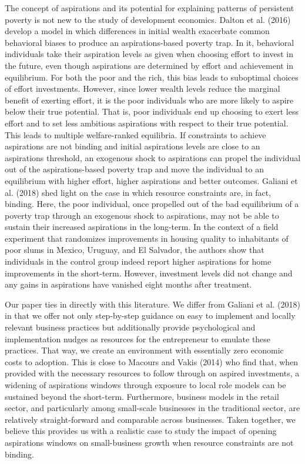 \documentclass[11.5pt]{article}
\begin{document}
The concept of aspirations and its potential for explaining patterns of persistent poverty is not new to the study of development economics. Dalton et al. (2016) develop a model in which differences in initial wealth exacerbate common behavioral biases to produce an aspirations-based poverty trap. In it, behavioral individuals take their aspiration levels as given when choosing effort to invest in the future, even though aspirations are determined by effort and achievement in equilibrium. For both the poor and the rich, this bias leads to suboptimal choices of effort investments. However, since lower wealth levels reduce the marginal benefit of exerting effort, it is the poor individuals who are more likely to aspire below their true potential. That is, poor individuals end up choosing to exert less effort and to set less ambitious aspirations with respect to their true potential. This leads to multiple welfare-ranked equilibria. If constraints to achieve aspirations are not binding and initial aspirations levels are close to an aspirations threshold, an exogenous shock to aspirations can propel the individual out of the aspirations-based poverty trap and move the individual to an equilibrium with higher effort, higher aspirations and better outcomes. Galiani et al. (2018) shed light on the case in which resource constraints are, in fact, binding. Here, the poor individual, once propelled out of the bad equilibrium of a poverty trap through an exogenous shock to aspirations, may not be able to sustain their increased aspirations in the long-term. In the context of a field experiment that randomizes improvements in housing quality to inhabitants of poor slums in Mexico, Uruguay, and El Salvador, the authors show that individuals in the control group indeed report higher aspirations for home improvements in the short-term. However, investment levels did not change and any gains in aspirations have vanished eight months after treatment.

Our paper ties in directly with this literature. We differ from Galiani et al. (2018) in that we offer not only step-by-step guidance on easy to implement and locally relevant business practices but additionally provide psychological and implementation nudges as resources for the entrepreneur to emulate these practices. That way, we create an environment with essentially zero economic costs to adoption. This is close to Macours and Vakis (2014) who find that, when provided with the necessary resources to follow through on aspired investments, a widening of aspirations windows through exposure to local role models can be sustained beyond the short-term. Furthermore, business models in the retail sector, and particularly among small-scale businesses in the traditional sector, are relatively straight-forward and comparable across businesses. Taken together, we believe this provides us with a realistic case to study the impact of opening aspirations windows on small-business growth when resource constraints are not binding.
\end{document}
